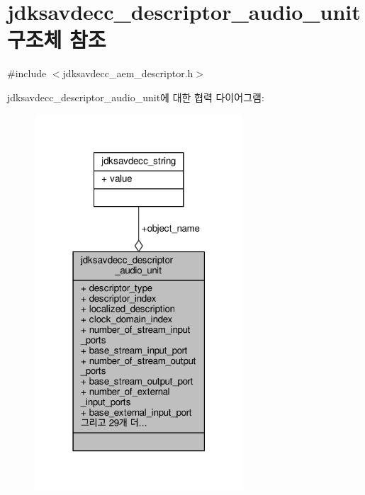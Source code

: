 \hypertarget{structjdksavdecc__descriptor__audio__unit}{}\section{jdksavdecc\+\_\+descriptor\+\_\+audio\+\_\+unit 구조체 참조}
\label{structjdksavdecc__descriptor__audio__unit}


{\ttfamily \#include $<$jdksavdecc\+\_\+aem\+\_\+descriptor.\+h$>$}



jdksavdecc\+\_\+descriptor\+\_\+audio\+\_\+unit에 대한 협력 다이어그램\+:
\nopagebreak
\begin{figure}[H]
\begin{center}
\leavevmode
\includegraphics[width=219pt]{structjdksavdecc__descriptor__audio__unit__coll__graph}
\end{center}
\end{figure}
